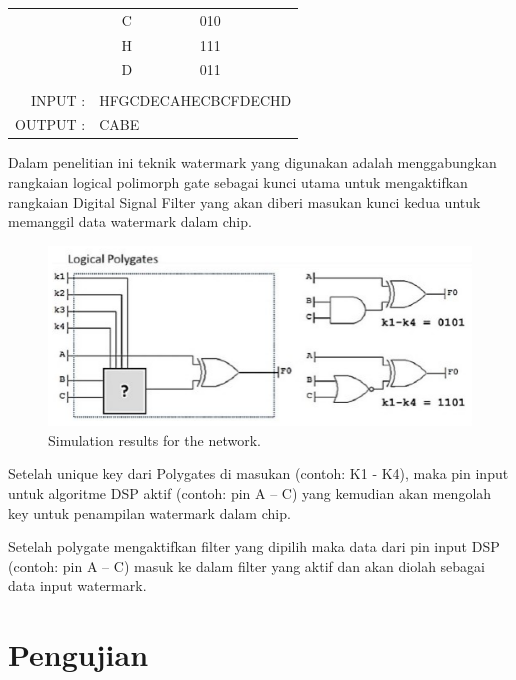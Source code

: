 \begin{table}[htbp]
\begin{tabular}{rlll}
		\cline{2-3}    \multicolumn{1}{r|}{} & \multicolumn{1}{c|}{C} & \multicolumn{1}{c|}{010} &  \bigstrut\\
		\cline{2-3}    \multicolumn{1}{r|}{} & \multicolumn{1}{c|}{H} & \multicolumn{1}{c|}{111} &  \bigstrut\\
		\cline{2-3}    \multicolumn{1}{r|}{} & \multicolumn{1}{c|}{D} & \multicolumn{1}{c|}{011} &  \bigstrut\\
		\cline{2-3}          &       &       &  \bigstrut[t]\\
		INPUT : & \multicolumn{3}{l}{HFGCDECAHECBCFDECHD} \\
		OUTPUT : & \multicolumn{3}{l}{CABE} \\
	\end{tabular}%
	\label{tab:addlabel}%
\end{table}%



Dalam penelitian ini teknik watermark yang digunakan adalah
menggabungkan rangkaian logical polimorph gate sebagai kunci utama untuk
mengaktifkan rangkaian Digital Signal Filter yang akan diberi masukan kunci
kedua untuk memanggil data watermark dalam chip.

\begin{figure}[!h]
	\centering
	\includegraphics[scale=0.8]{images/polymorphgate}
	\caption{Simulation results for the network.}
	\label{fig_sim}
\end{figure}

Setelah unique key dari Polygates di masukan (contoh: K1 - K4), maka pin
input untuk algoritme DSP aktif (contoh: pin A – C) yang kemudian akan
mengolah key untuk penampilan watermark dalam chip.

Setelah polygate mengaktifkan filter yang dipilih maka data dari pin input
DSP (contoh: pin A – C) masuk ke dalam filter yang aktif dan akan diolah sebagai
data input watermark.

\section{Pengujian}

